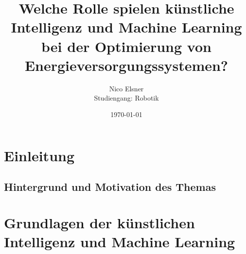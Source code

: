 \documentclass[
11pt, 
a4paper,
DIV = 14,
twoside,
twocolumn, 
parskip =half, 
headsepline,
openright,
]{scrreprt}
\begin{document}
	
	\title{Welche Rolle spielen künstliche Intelligenz und Machine Learning bei der Optimierung von Energieversorgungssystemen?}
	\author{Nico Elsner\\
		Studiengang: Robotik}
	\date{\today}
	\maketitle

	\clearpage
	\begingroup
	  \pagestyle{empty}
	  \renewcommand*\chapterpagestyle{empty}
	  \tableofcontents 
	\clearpage
	\endgroup
	
	\thispagestyle{empty}

	\chapter{Einleitung}
	\setcounter{page}{1}
	\section{Hintergrund und Motivation des Themas}
	


	\chapter{Grundlagen der künstlichen Intelligenz und Machine Learning}
	
\end{document}
